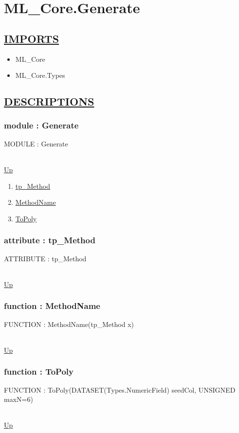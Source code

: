 \chapter*{ML\_Core.Generate}
\hypertarget{ML_Core.Generate}{}

\section*{\underline{IMPORTS}}
\begin{itemize}
\item ML\_Core
\item ML\_Core.Types
\end{itemize}

\section*{\underline{DESCRIPTIONS}}
\subsection*{module : Generate}
\hypertarget{ecldoc:ML_Core.Generate}{MODULE : Generate} \\
\hyperlink{ecldoc:}{Up} \\
\par
\begin{enumerate}
\item \hyperlink{ecldoc:ecldoc-tp_Method}{tp\_Method}
\item \hyperlink{ecldoc:ml_core.generate.methodname}{MethodName}
\item \hyperlink{ecldoc:ml_core.generate.topoly}{ToPoly}
\end{enumerate}
\subsection*{attribute : tp\_Method}
\hypertarget{ecldoc:ecldoc-tp_Method}{ATTRIBUTE : tp\_Method} \\
\hyperlink{ecldoc:ML_Core.Generate}{Up} \\
\par
\subsection*{function : MethodName}
\hypertarget{ecldoc:ml_core.generate.methodname}{FUNCTION : MethodName(tp\_Method x)} \\
\hyperlink{ecldoc:ML_Core.Generate}{Up} \\
\par
\subsection*{function : ToPoly}
\hypertarget{ecldoc:ml_core.generate.topoly}{FUNCTION : ToPoly(DATASET(Types.NumericField) seedCol, UNSIGNED maxN=6)} \\
\hyperlink{ecldoc:ML_Core.Generate}{Up} \\
\par

